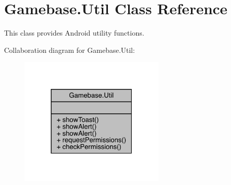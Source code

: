 \hypertarget{classcom_1_1toast_1_1android_1_1gamebase_1_1_gamebase_1_1_util}{}\section{Gamebase.\+Util Class Reference}
\label{classcom_1_1toast_1_1android_1_1gamebase_1_1_gamebase_1_1_util}


This class provides Android utility functions.  




Collaboration diagram for Gamebase.\+Util\+:
\nopagebreak
\begin{figure}[H]
\begin{center}
\leavevmode
\includegraphics[width=199pt]{classcom_1_1toast_1_1android_1_1gamebase_1_1_gamebase_1_1_util__coll__graph}
\end{center}
\end{figure}
